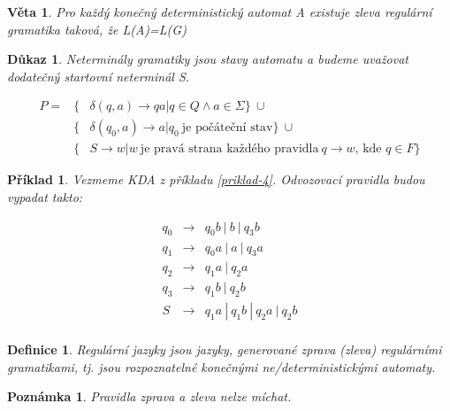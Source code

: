 \documentclass[10pt, a4paper, titlepage]{article}
\theoremstyle{note}
\newtheorem{veta}{Věta}
\newtheorem{definice}{Definice}
\newtheorem{dukaz}{Důkaz}
\newtheorem{priklad}{Příklad}
\newtheorem{poznamka}{Poznámka}
\begin{document}
\begin{veta}
Pro každý konečný deterministický automat \textit{A} existuje zleva regulární gramatika taková, že \textit{L(A)=L(G)}
\end{veta}

\begin{dukaz}
Neterminály gramatiky jsou stavy automatu a budeme uvažovat dodatečný startovní neterminál S.

\begin{eqnarray*}
P = &\lbrace& \delta (q,a) \rightarrow qa | q \in Q \wedge a \in \Sigma \rbrace \ \cup \\
&\lbrace& \delta (q_0,a) \rightarrow a | q_0\ \text{je počáteční stav} \rbrace \ \cup \\
&\lbrace& S \rightarrow w|w \ \text{je pravá strana každého pravidla}\ q \rightarrow w\text{, kde } q \in F \rbrace
\end{eqnarray*}

\end{dukaz}

\begin{priklad}
Vezmeme KDA z příkladu \ref{priklad-4}.
Odvozovací pravidla budou vypadat takto:

\begin{eqnarray*}
q_0 &\rightarrow& q_{0}b\ |\ b\ |\ q_{3}b \\
q_1 &\rightarrow& q_{0}a\ |\ a\ |\ q_{3}a \\
q_2 &\rightarrow& q_{1}a\ |\ q_{2}a \\
q_3 &\rightarrow& q_{1}b\ |\ q_{2}b \\
S &\rightarrow& q_{1}a\ |\ q_{1}b\ |\ q_{2}a\ |\ q_{2}b \\
\end{eqnarray*}

\end{priklad}

\begin{definice}
Regulární jazyky jsou jazyky, generované zprava (zleva) regulárními gramatikami, tj. jsou rozpoznatelné konečnými ne/deterministickými automaty.
\end{definice}

\begin{poznamka}
Pravidla zprava a zleva nelze míchat.
\end{poznamka}
\end{document}
